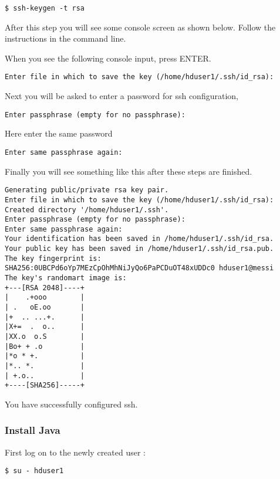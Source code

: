 \begin{lstlisting}
$ ssh-keygen -t rsa
\end{lstlisting}

After this step you will see some console screen as shown below. Follow
the instructions in the command line.

When you see the following console input, press ENTER.

\begin{lstlisting}
Enter file in which to save the key (/home/hduser1/.ssh/id_rsa):
\end{lstlisting}

Next you will be asked to enter a password for ssh configuration,

\begin{lstlisting}
Enter passphrase (empty for no passphrase):
\end{lstlisting}

Here enter the same password

\begin{lstlisting}
Enter same passphrase again:
\end{lstlisting}

Finally you will see something like this after these steps are finished.

\begin{lstlisting}
Generating public/private rsa key pair.
Enter file in which to save the key (/home/hduser1/.ssh/id_rsa):
Created directory '/home/hduser1/.ssh'.
Enter passphrase (empty for no passphrase):
Enter same passphrase again:
Your identification has been saved in /home/hduser1/.ssh/id_rsa.
Your public key has been saved in /home/hduser1/.ssh/id_rsa.pub.
The key fingerprint is:
SHA256:0UBCPd6oYp7MEzCpOhMhNiJyQo6PaPCDuOT48xUDDc0 hduser1@messi
The key's randomart image is:
+---[RSA 2048]----+
|    .+ooo        |
| .   oE.oo       |
|+  .. ...+.      |
|X+=  .  o..      |
|XX.o  o.S        |
|Bo+ + .o         |
|*o * +.          |
|*.. *.           |
| +.o..           |
+----[SHA256]-----+
\end{lstlisting}

You have successfully configured ssh.

\subsubsection{Install Java}\label{install-java}

First log on to the newly created user :

\begin{lstlisting}
$ su - hduser1
\end{lstlisting}


